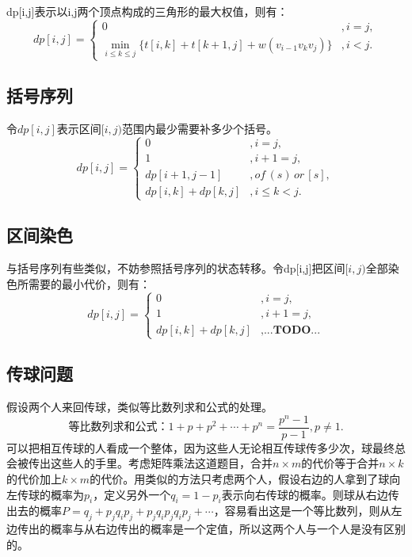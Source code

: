 \documentclass{article}
\newcommand{\romannum}[1]{\uppercase\expandafter{\romannumeral#1}}
\begin{document}
dp[i,j]表示以i,j两个顶点构成的三角形的最大权值，则有：
\begin{equation*}
    dp[i,j]=
    \begin{cases}
        0&,i=j,\\
        \min\limits_{i\le k\le j}\{t[i,k]+t[k+1,j]+w(v_{i-1}v_kv_j)\}&,i<j.
    \end{cases}
\end{equation*}
\subsection{括号序列}
令$dp[i,j]$表示区间$[i,j)$范围内最少需要补多少个括号。
\begin{equation*}
    dp[i,j]=
    \begin{cases}
        0&,i=j,\\
        1&,i+1=j,\\
        dp[i+1,j-1]&,of\,(s)\,or\,[s],\\
        dp[i,k]+dp[k,j]&,i\le k<j.
    \end{cases}
\end{equation*}
\subsection{区间染色\romannum{2}}
与括号序列有些类似，不妨参照括号序列的状态转移。令dp[i,j]把区间$[i,j)$全部染色所需要的最小代价，则有：
\begin{equation*}
    dp[i,j]=
    \begin{cases}
        0&,i=j,\\
        1&,i+1=j,\\
        dp[i,k]+dp[k,j]&,\textbf{...TODO...}
    \end{cases}
\end{equation*}
\subsection{传球问题\romannum{2}}
假设两个人来回传球，类似等比数列求和公式的处理。
\begin{equation*}
    等比数列求和公式：1+p+p^2+\cdots+p^n=\frac{p^n-1}{p-1},p\neq 1.
\end{equation*}
可以把相互传球的人看成一个整体，因为这些人无论相互传球传多少次，球最终总会被传出这些人的手里。考虑矩阵乘法这道题目，合并$n\times m$的代价等于合并$n\times k$的代价加上$k\times m$的代价。用类似的方法只考虑两个人，假设右边的人拿到了球向左传球的概率为$p_i$，定义另外一个$q_i=1-p_i$表示向右传球的概率。则球从右边传出去的概率$P=q_j+p_jq_ip_j+p_jq_ip_jq_ip_j+\cdots$，容易看出这是一个等比数列，则从左边传出的概率与从右边传出的概率是一个定值，所以这两个人与一个人是没有区别的。
\end{document}
